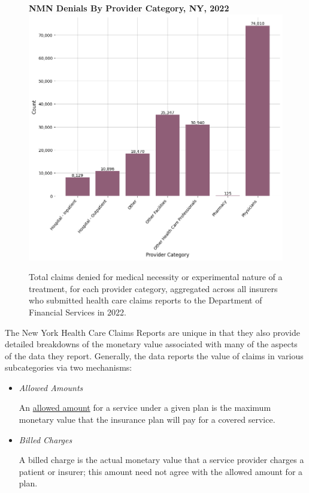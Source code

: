 \documentclass[12pt, a4paper,twoside]{report}
\theoremstyle{plain} %
\theoremstyle{definition} %
\theoremstyle{remark} %
\numberwithin{equation}{chapter}
\begin{document}
		\begin{figure}[h!]
			\centering
			\textbf{NMN Denials By Provider Category, NY, 2022}
			\includegraphics[width=\columnwidth]{images/ny_claim_reports/nmn_denials_by_provider_cat.png}
			\caption{Total claims denied for medical necessity or experimental nature of a treatment, for each provider category, aggregated across all insurers who submitted health care claims reports to the Department of Financial Services in 2022.}
			\label{nynmndenialsbyprovidercat}
		\end{figure}
	
	\clearpage
	
	
		The New York Health Care Claims Reports are unique in that they also provide detailed breakdowns of the monetary value associated with many of the aspects of the data they report. Generally, the data reports the value of claims in various subcategories via two mechanisms:
		
		\begin{itemize}
			\item \emph{Allowed Amounts}
			
				An \href{https://www.healthcare.gov/glossary/allowed-amount/}{allowed amount} for a service under a given plan is the maximum monetary value that the insurance plan will pay for a covered service.
				
			\item \emph{Billed Charges}
			
			A billed charge is the actual monetary value that a service provider charges a patient or insurer; this amount need not agree with the allowed amount for a plan.
			
		\end{itemize}
			
\end{document}
